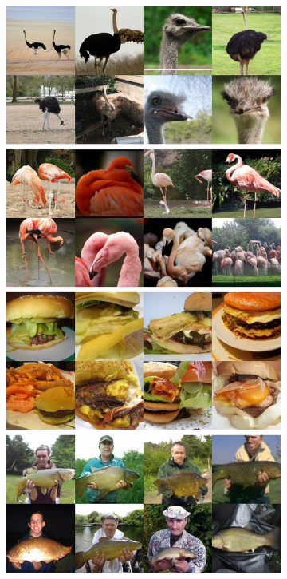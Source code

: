 \documentclass[12pt, a4paper]{article}
\begin{document}
\begin{figure}[ht]
\begin{center}
\begin{subfigure}[]{0.25\textwidth}
    \end{subfigure}\quad
    \begin{subfigure}[]{0.25\textwidth}
    \centerline{\includegraphics[width=\textwidth]{Images/samples/reflow_imagenet256-guided-250step.jpg}}

\end{subfigure}
\end{center}
\end{figure}
\end{document}
